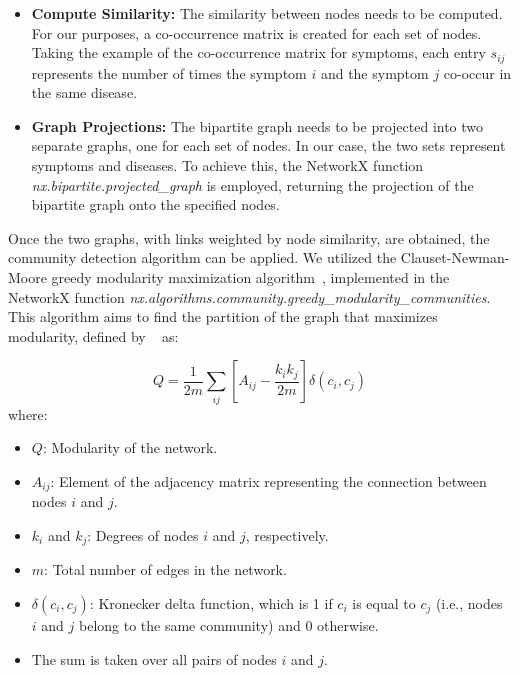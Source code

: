\begin{itemize}
    \setlength\itemsep{1em}
    \item \textbf{Compute Similarity:} The similarity between nodes needs to be computed. For our purposes,
          a co-occurrence matrix is created for each set of nodes. Taking the example of the co-occurrence matrix
          for symptoms, each entry \(s_{ij}\) represents the number of times the symptom \(i\) and the symptom \(j\)
          co-occur in the same disease.

    \item \textbf{Graph Projections:} The bipartite graph needs to be projected into two separate graphs,
          one for each set of nodes. In our case, the two sets represent symptoms and diseases. To achieve this,
          the NetworkX function \textit{nx.bipartite.projected\_graph} is employed, returning the projection of
          the bipartite graph onto the specified nodes.

\end{itemize}
\noindent
Once the two graphs, with links weighted by node similarity, are obtained, the community detection algorithm
can be applied. We utilized the Clauset-Newman-Moore greedy modularity maximization algorithm~\cite{Clauset_Newman_Moore_2004},
implemented in the NetworkX function \textit{nx.algorithms.community.greedy\_modularity\_communities}. This algorithm aims to
find the partition of the graph that maximizes modularity, defined by ~\cite{Newman_2006} as:

\begin{equation}
    Q = \frac{1}{2m} \sum_{ij} \left[A_{ij} - \frac{k_i k_j}{2m}\right] \delta(c_i, c_j) \label{eq:modularity}
\end{equation}
\noindent
where:

\begin{itemize}
    \setlength\itemsep{0.4em} %
    \item \(Q\): Modularity of the network.
    \item \(A_{ij}\): Element of the adjacency matrix representing the connection between nodes \(i\) and \(j\).
    \item \(k_i\) and \(k_j\): Degrees of nodes \(i\) and \(j\), respectively.
    \item \(m\): Total number of edges in the network.
    \item \(\delta(c_i, c_j)\): Kronecker delta function, which is 1 if \(c_i\) is equal to \(c_j\) (i.e., nodes \(i\)
          and \(j\) belong to the same community) and 0 otherwise.
    \item The sum is taken over all pairs of nodes \(i\) and \(j\).
\end{itemize}






